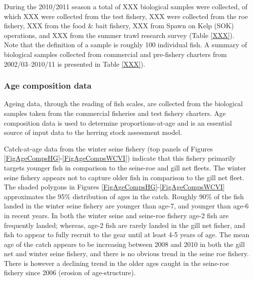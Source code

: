 	During the 2010/2011 season a total of XXX biological samples were collected, of which XXX were collected from the test fishery, XXX were collected from the roe fishery, XXX from the food \& bait fishery, XXX from Spawn on Kelp (SOK) operations, and XXX from the summer trawl research survey (Table \ref{XXX}).  Note that the definition of a sample is roughly 100 individual fish.  A summary of biological samples collected from commercial and pre-fishery charters from 2002/03--2010/11 is presented in Table \ref{XXX}).
	
	
	
	
	\subsubsection{Age composition data}
	
	Ageing data, through the reading of fish scales, are collected from the biological samples taken from the commercial fisheries and test fishery charters. Age composition data is used to determine proportions-at-age and is an essential source of input data to the herring stock assessment model.
	
	Catch-at-age data from the winter seine fishery (top panels of Figures \ref{FigAgeCompsHG}-\ref{FigAgeCompsWCVI}) indicate that this fishery primarily targets younger fish in comparison to the seine-roe and gill net fleets. The winter seine fishery appears not to capture older fish in comparison to the gill net fleet. The shaded polygons in Figures \ref{FigAgeCompsHG}-\ref{FigAgeCompsWCVI} approximates the 95\% distribution of ages in the catch.  Roughly 90\% of the fish landed in the winter seine fishery are younger than age-7, and younger than age-6 in recent years.  In both the winter seine and seine-roe fishery age-2 fish are frequently landed; whereas, age-2 fish are rarely landed in the gill net fisher, and fish to appear to fully recruit to the gear until at least 4-5 years of age.  The mean age of the catch appears to be increasing between 2008 and 2010 in both the gill net and winter seine fishery, and there is no obvious trend in the seine roe fishery.  There is however a declining trend in the older ages caught in the seine-roe fishery since 2006 (erosion of age-structure).

